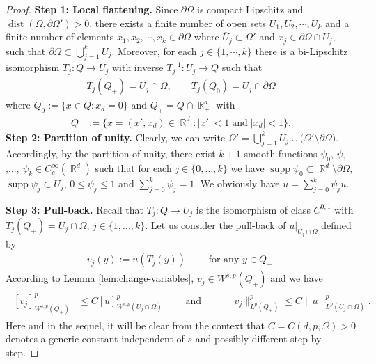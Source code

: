 \documentclass[12pt, reqno]{amsart}%
\theoremstyle{plain}  %
\theoremstyle{definition}  %
\theoremstyle{remark}
\numberwithin{equation}{section}
\DeclareMathOperator{\dist}{dist}
\DeclareMathOperator{\supp}{supp}
\DeclareMathOperator{\R}{\mathbb{R}}
\begin{document}
\begin{proof}
\textbf{Step 1: Local flattening.} Since $\partial\Omega$ is compact Lipschitz and $\dist(\Omega, \partial \Omega')>0$, there exists a finite number of open sets $U_1,U_2,\cdots, U_k$ and a finite number of elements $x_1, x_2, \cdots , x_k\in \partial\Omega$ where $\overline{U}_j\subset \Omega' $ and  $x_j\in \partial\Omega\cap U_j$, such that $\partial{\Omega} \subset \bigcup_{j=1}^k U_j$.  Moreover, for each $j\in\{1,\cdots,k\}$ there is a bi-Lipschitz isomorphism $T_j:Q\to U_j$ with inverse $T^{-1}_j: U_j\to Q$
such that
\begin{align*}
T_j(Q_+)=U_j\cap\Omega, \qquad
T_j(Q_0)=U_j\cap\partial\Omega
\end{align*}
where $Q_0:=\{ x\in Q :
 x_d=0\}$ and $Q_+=Q\cap \R^d_+$ with
\begin{align*}
Q&:=\{ x=(x',x_d)\in\R^d : |x'|<1\;\mbox{and}\;|x_d|<1\}.
\end{align*}
\textbf{Step 2: Partition of unity.} Clearly, we can write $ \Omega'= \bigcup_{j=1}^k U_j \cup \big(\Omega' \setminus \partial{\Omega}  \big)$. Accordingly, by the partition of unity,  there exist $k+1$ smooth functions $\psi_0$, $\psi_1$,..., $\psi_k\in C_c^\infty(\R^d)$ such that for each $j\in \{0,... ,k\}$ we have $\supp \psi_0\subset \R^d\setminus \partial{\Omega}$, $\supp\psi_j\subset U_j$, $0\leq \psi_j \leq 1$ and $\sum_{j=0}^k \psi_j=1$. We obviously have $
u=\sum_{j=0}^k \psi_j u.$
\medskip

\textbf{Step 3: Pull-back.} Recall that $T_j: Q\to U_j$ is the isomorphism of class $C^{0,1}$ with $T_j(Q_+)=U_j\cap \Omega$, $j\in\{1,...,k\}$. Let us consider the pull-back of $u|_{U_j\cap\Omega }$ defined by
\begin{align*}
v_j(y):=u( T_j(y) ) \qquad \text{ for any } y\in Q_+.
\end{align*}
 According to Lemma \ref{lem:change-variables}, $v_j \in W^{s,p}\left( Q_+ \right)$ and we have
\begin{align}\label{eq:Tj-push-forward}
\begin{split}
[v_j]^p_{W^{s,p}(Q_+) }
&\leq C [u]^p_{W^{s,p}(U_j\cap\Omega)}
\qquad \text{ and }\qquad
\|v_j\|^p_{L^p(Q_+) }
\leq C \|u\|^p_{L^p(U_j\cap\Omega)}.
\end{split}
\end{align}
Here and in the sequel, it will be clear from the context that $C = C(d,p,\Omega)>0$  denotes a generic constant independent of $s$ and possibly different step by step.


\end{proof}
\end{document}
